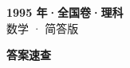 \documentclass[zihao=-4, a4paper]{ctexart}
\begin{document}
\begin{center}
  {\Large\bfseries 1995 年·全国卷·理科}\\[4pt]
  {\large 数学 · 简答版}
\end{center}
\medskip
{}

\clearpage
{}
\begin{center}{\Large\bfseries 答案速查}\end{center}
\medskip

\end{document}
